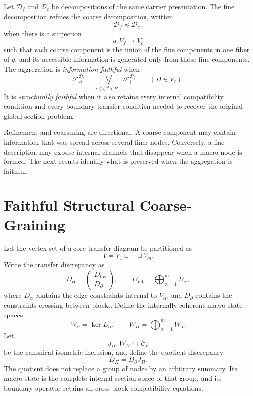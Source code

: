 \begin{SRWTdefinition}\label{SRWT:def:decomposition-refinement}
Let \(\mathcal D_f\) and \(\mathcal D_c\) be decompositions of the same carrier
presentation. The fine decomposition refines the coarse decomposition,
written
\[
\mathcal D_f\preceq\mathcal D_c,
\]
when there is a surjection
\[
q:V_f\longrightarrow V_c
\]
such that each coarse component is the union of the fine components in one
fiber of \(q\), and its accessible information is generated only from those
fine components. The aggregation is \emph{information faithful} when
\[
\mathscr F_B^{\mathcal D_c}
=
\bigvee_{i\in q^{-1}(B)}
\mathscr F_i^{\mathcal D_f}
\qquad(B\in V_c).
\]
It is \emph{structurally faithful} when it also retains every internal
compatibility condition and every boundary transfer condition needed to
recover the original global-section problem.
\end{SRWTdefinition}

Refinement and coarsening are directional. A coarse component may contain
information that was spread across several finer nodes. Conversely, a fine
description may expose internal channels that disappear when a macro-node is
formed. The next results identify what is preserved when the aggregation is
faithful.

\section{Faithful Structural Coarse-Graining}

Let the vertex set of a core-transfer diagram be partitioned as
\[
V=V_1\sqcup\cdots\sqcup V_m.
\]
Write the transfer discrepancy as
\[
D_H
=
\begin{pmatrix}
D_{\mathrm{int}}\\
D_{\partial}
\end{pmatrix},
\qquad
D_{\mathrm{int}}
=
\bigoplus_{\alpha=1}^{m}D_\alpha,
\]
where \(D_\alpha\) contains the edge constraints internal to \(V_\alpha\),
and \(D_{\partial}\) contains the constraints crossing between blocks. Define
the internally coherent macro-state spaces
\[
W_\alpha=\ker D_\alpha,
\qquad
W_{\Pi}=\bigoplus_{\alpha=1}^{m}W_\alpha.
\]
Let
\[
J_\Pi:W_\Pi\hookrightarrow\mathcal C_V
\]
be the canonical isometric inclusion, and define the quotient discrepancy
\[
D_\Pi=D_{\partial}J_\Pi.
\]
The quotient does not replace a group of nodes by an arbitrary summary. Its
macro-state is the complete internal section space of that group, and its
boundary operator retains all cross-block compatibility equations.

